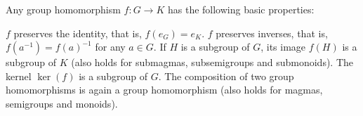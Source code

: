 \begin{proposition}\label{thm:group_homomorphism_properties}
  Any group homomorphism \( f: G \to K \) has the following basic properties:
  \begin{defenum}
     \( f \) preserves the identity, that is, \( f(e_G) = e_K \).
     \( f \) preserves inverses, that is, \( f(a^{-1}) = f(a)^{-1} \) for any \( a \in G \).
     If \( H \) is a subgroup of \( G \), its image \( f(H) \) is a subgroup of \( K \) (also holds for submagmas, subsemigroups and submonoids).
     The kernel \( \ker(f) \) is a subgroup of \( G \).
     The composition of two group homomorphisms is again a group homomorphism (also holds for magmas, semigroups and monoids).
  \end{defenum}
\end{proposition}
